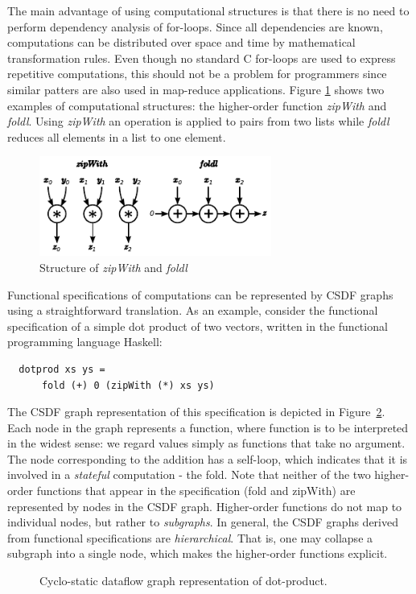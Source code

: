 \documentclass[journal]{IEEEtran}
\begin{document}
  The main advantage of using computational structures is that there is no need to perform dependency analysis of for-loops.
  Since all dependencies are known, computations can be distributed over space and time by mathematical transformation rules.
  Even though no standard C for-loops are used to express repetitive computations, this should not be a problem for programmers since similar patters are also used in map-reduce applications.
  Figure \ref{fig:zipwthandfoldlstruct} shows two examples of computational structures: the higher-order function \emph{zipWith} and \emph{foldl}.
  Using \emph{zipWith} an operation is applied to pairs from two lists while \emph{foldl} reduces all elements in a list to one element.

  \begin{figure}[h!]
    \centering
    \includegraphics[width=3in]{HOFs}
    \caption{Structure of \emph{zipWith} and \emph{foldl}}
    \label{fig:zipwthandfoldlstruct}
  \end{figure}

  Functional specifications of computations can be represented by CSDF graphs using a straightforward translation.
  As an example, consider the functional specification of a simple dot product of two vectors, written in the functional programming language Haskell:

\begin{verbatim}
  dotprod xs ys = 
      fold (+) 0 (zipWith (*) xs ys)  
\end{verbatim}


  The CSDF graph representation of this specification is depicted in Figure~\ref{fig:csdf-dotproduct}.
  Each node in the graph represents a function, where function is to be interpreted in the widest sense: we regard values simply as functions that take no argument.
  The node corresponding to the addition has a self-loop, which indicates that it is involved in a \emph{stateful} computation - the fold.
  Note that neither of the two higher-order functions that appear in the specification (fold and zipWith) are represented by nodes in the CSDF graph.
  Higher-order functions do not map to individual nodes, but rather to \emph{subgraphs}.
  In general, the CSDF graphs derived from functional specifications are \emph{hierarchical}.
  That is, one may collapse a subgraph into a single node, which makes the higher-order functions explicit.
  \begin{figure}[h!]
    \centering
    
    \caption{Cyclo-static dataflow graph representation of dot-product.}
    \label{fig:csdf-dotproduct}
  \end{figure}
\end{document}
